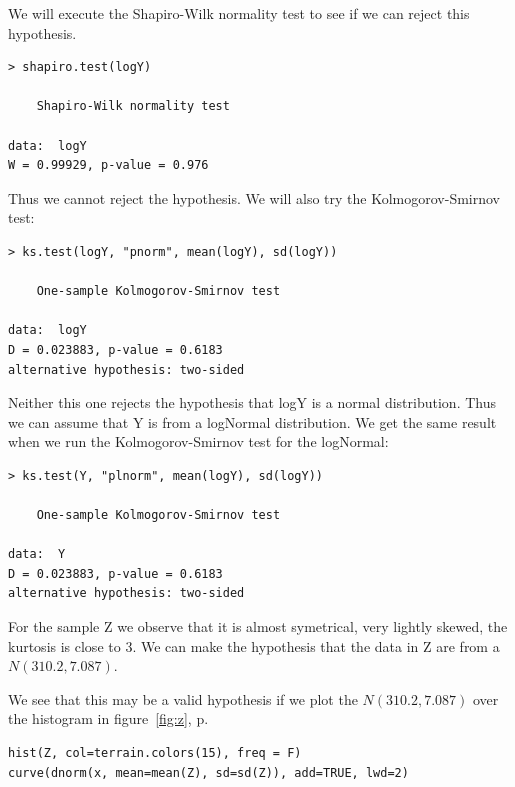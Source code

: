 \documentclass{article}
\begin{document}
\begin{enumerate}
  We will execute the Shapiro-Wilk normality test to see if we can reject this
  hypothesis.
  
  \begin{lstlisting}
> shapiro.test(logY)

	Shapiro-Wilk normality test

data:  logY
W = 0.99929, p-value = 0.976
  \end{lstlisting}

  Thus we cannot reject the hypothesis. We will also try the Kolmogorov-Smirnov
  test:
  
  \begin{lstlisting}
> ks.test(logY, "pnorm", mean(logY), sd(logY))

	One-sample Kolmogorov-Smirnov test

data:  logY
D = 0.023883, p-value = 0.6183
alternative hypothesis: two-sided
  \end{lstlisting}
  
  Neither this one rejects the hypothesis that logY is a normal distribution.
  Thus we can assume that Y is from a logNormal distribution. We get the same
  result when we run the Kolmogorov-Smirnov test for the logNormal:
  
  \begin{lstlisting}
> ks.test(Y, "plnorm", mean(logY), sd(logY))

	One-sample Kolmogorov-Smirnov test

data:  Y
D = 0.023883, p-value = 0.6183
alternative hypothesis: two-sided
  \end{lstlisting}
  
  For the sample Z we observe that it is almost symetrical, very lightly
  skewed, the kurtosis is close to 3. We can make the hypothesis that the data in Z
  are from a $N(310.2, 7.087)$.
  
  We see that this may be a valid hypothesis if we plot the $N(310.2, 7.087)$
  over the histogram in figure~\ref{fig:z}, p.~\pageref{fig:z}
  
  \begin{lstlisting}
hist(Z, col=terrain.colors(15), freq = F)
curve(dnorm(x, mean=mean(Z), sd=sd(Z)), add=TRUE, lwd=2)
  \end{lstlisting}
  

\end{enumerate}
\end{document}
